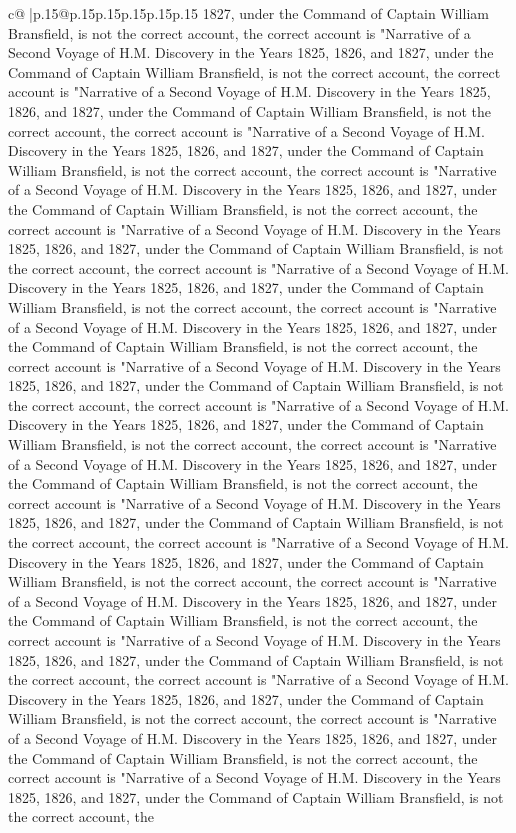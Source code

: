 \documentclass{article}
\begin{document}
{\begin{supertabular}{c@{$\;$}|p{.15\linewidth}@{}p{.15\linewidth}p{.15\linewidth}p{.15\linewidth}p{.15\linewidth}p{.15\linewidth}}
{{{1827, under the Command of Captain William Bransfield, is not the correct account, the correct account is "Narrative of a Second Voyage of H.M. Discovery in the Years 1825, 1826, and 1827, under the Command of Captain William Bransfield, is not the correct account, the correct account is "Narrative of a Second Voyage of H.M. Discovery in the Years 1825, 1826, and 1827, under the Command of Captain William Bransfield, is not the correct account, the correct account is "Narrative of a Second Voyage of H.M. Discovery in the Years 1825, 1826, and 1827, under the Command of Captain William Bransfield, is not the correct account, the correct account is "Narrative of a Second Voyage of H.M. Discovery in the Years 1825, 1826, and 1827, under the Command of Captain William Bransfield, is not the correct account, the correct account is "Narrative of a Second Voyage of H.M. Discovery in the Years 1825, 1826, and 1827, under the Command of Captain William Bransfield, is not the correct account, the correct account is "Narrative of a Second Voyage of H.M. Discovery in the Years 1825, 1826, and 1827, under the Command of Captain William Bransfield, is not the correct account, the correct account is "Narrative of a Second Voyage of H.M. Discovery in the Years 1825, 1826, and 1827, under the Command of Captain William Bransfield, is not the correct account, the correct account is "Narrative of a Second Voyage of H.M. Discovery in the Years 1825, 1826, and 1827, under the Command of Captain William Bransfield, is not the correct account, the correct account is "Narrative of a Second Voyage of H.M. Discovery in the Years 1825, 1826, and 1827, under the Command of Captain William Bransfield, is not the correct account, the correct account is "Narrative of a Second Voyage of H.M. Discovery in the Years 1825, 1826, and 1827, under the Command of Captain William Bransfield, is not the correct account, the correct account is "Narrative of a Second Voyage of H.M. Discovery in the Years 1825, 1826, and 1827, under the Command of Captain William Bransfield, is not the correct account, the correct account is "Narrative of a Second Voyage of H.M. Discovery in the Years 1825, 1826, and 1827, under the Command of Captain William Bransfield, is not the correct account, the correct account is "Narrative of a Second Voyage of H.M. Discovery in the Years 1825, 1826, and 1827, under the Command of Captain William Bransfield, is not the correct account, the correct account is "Narrative of a Second Voyage of H.M. Discovery in the Years 1825, 1826, and 1827, under the Command of Captain William Bransfield, is not the correct account, the correct account is "Narrative of a Second Voyage of H.M. Discovery in the Years 1825, 1826, and 1827, under the Command of Captain William Bransfield, is not the correct account, the correct account is "Narrative of a Second Voyage of H.M. Discovery in the Years 1825, 1826, and 1827, under the Command of Captain William Bransfield, is not the correct account, the correct account is "Narrative of a Second Voyage of H.M. Discovery in the Years 1825, 1826, and 1827, under the Command of Captain William Bransfield, is not the correct account, the }}}
\end{supertabular}}
\end{document}
